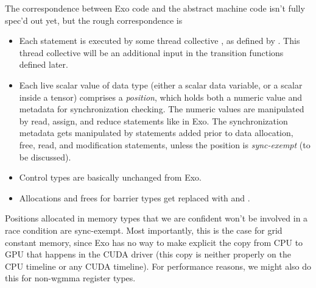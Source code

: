 \newpage
{}
\label{ch:AbstractMachineGrammar}




\filbreak
{}



\filbreak
{}



\filbreak
{}

The correspondence between Exo code and the abstract machine code isn't fully spec'd out yet, but the rough correspondence is

\begin{itemize}
  \item Each statement is executed by some thread collective , as defined by .
    This thread collective will be an additional input in the transition functions defined later.
  \filbreak
  \item Each live scalar value of data type (either a scalar data variable, or a scalar inside a tensor) comprises a \textit{position},
    which holds both a numeric value and metadata for synchronization checking.
    The numeric values are manipulated by read, assign, and reduce statements like in Exo.
    The synchronization metadata gets manipulated by  statements added prior to data allocation, free, read, and modification statements,
    unless the position is \textit{sync-exempt} (to be discussed).
  \filbreak
  \item Control types are basically unchanged from Exo.
  \filbreak
  \item Allocations and frees for barrier types get replaced with  and .
\end{itemize}

\filbreak
{} Positions allocated in memory types that we are confident won't be involved in a race condition are sync-exempt.
Most importantly, this is the case for grid constant memory, since Exo has no way to make explicit the copy from CPU to GPU that happens in the CUDA driver (this copy is neither properly on the CPU timeline or any CUDA timeline).
For performance reasons, we might also do this for non-wgmma register types.

